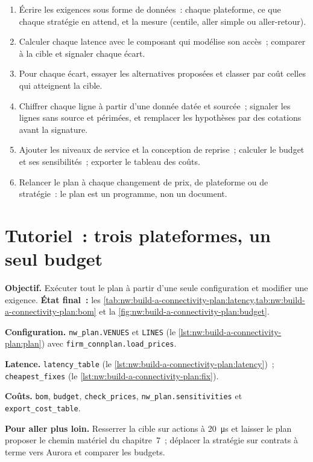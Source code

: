 \begin{method}\label{met:nw:build-a-connectivity-plan:method}
\begin{enumerate}
\item Écrire les exigences sous forme de données~: chaque plateforme, ce que chaque stratégie en attend, et la mesure (centile, aller simple ou aller-retour).
\item Calculer chaque latence avec le composant qui modélise son accès~; comparer à la cible et signaler chaque écart.
\item Pour chaque écart, essayer les alternatives proposées et classer par coût celles qui atteignent la cible.
\item Chiffrer chaque ligne à partir d'une donnée datée et sourcée~; signaler les lignes sans source et périmées, et remplacer les hypothèses par des cotations avant la signature.
\item Ajouter les niveaux de service et la conception de reprise~; calculer le budget et ses sensibilités~; exporter le tableau des coûts.
\item Relancer le plan à chaque changement de prix, de plateforme ou de stratégie~: le plan est un programme, non un document.
\end{enumerate}
\end{method}

\section{Tutoriel~: trois plateformes, un seul budget}\label{tut:nw:build-a-connectivity-plan:tut}

\begin{tutorial}
\textbf{Objectif.} Exécuter tout le plan à partir d'une seule configuration et modifier une exigence.
\textbf{État final~:} les \cref{tab:nw:build-a-connectivity-plan:latency,tab:nw:build-a-connectivity-plan:bom} et
la \cref{fig:nw:build-a-connectivity-plan:budget}.
\begin{tutsteps}
\item \textbf{Configuration.} \texttt{nw\_plan.VENUES} et \texttt{LINES} (le \cref{lst:nw:build-a-connectivity-plan:plan}) avec
  \texttt{firm\_connplan.load\_prices}.
\item \textbf{Latence.} \texttt{latency\_table} (le \cref{lst:nw:build-a-connectivity-plan:latency})~; \texttt{cheapest\_fixes}
  (le \cref{lst:nw:build-a-connectivity-plan:fix}).
\item \textbf{Coûts.} \texttt{bom}, \texttt{budget}, \texttt{check\_prices}, \texttt{nw\_plan.sensitivities} et
  \texttt{export\_cost\_table}.
\end{tutsteps}
\textbf{Pour aller plus loin.} Resserrer la cible sur actions à \qty{20}{\micro\second} et laisser le plan proposer le chemin matériel du chapitre~7~;
déplacer la stratégie sur contrats à terme vers Aurora et comparer les budgets.
\end{tutorial}

